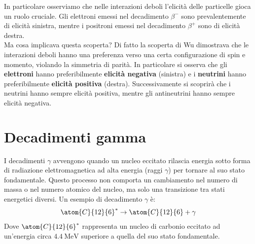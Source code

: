 
In particolare osserviamo che nelle interazioni deboli l'elicità delle particelle gioca un ruolo cruciale. Gli elettroni emessi nel decadimento $\beta^-$ sono prevalentemente di elicità sinistra, mentre i positroni emessi nel decadimento $\beta^+$ sono di elicità destra.\\
Ma cosa implicava questa scoperta? Di fatto la scoperta di Wu dimostrava che le interazioni deboli hanno una preferenza verso una certa configurazione di spin e momento, violando la simmetria di parità. In particolare si osserva che gli \textbf{elettroni} hanno preferibilmente \textbf{elicità negativa} (sinistra) e i \textbf{neutrini} hanno preferibilmente \textbf{elicità positiva} (destra). Successivamente si scoprirà che i neutrini hanno sempre elicità positiva, mentre gli antineutrini hanno sempre elicità negativa.
\section{Decadimenti gamma}
I decadimenti $\gamma$ avvengono quando un nucleo eccitato rilascia energia sotto forma di radiazione elettromagnetica ad alta energia (raggi $\gamma$) per tornare al suo stato fondamentale. Questo processo non comporta un cambiamento nel numero di massa o nel numero atomico del nucleo, ma solo una transizione tra stati energetici diversi. Un esempio di decadimento $\gamma$ è:
\begin{equation}
    \atom{C}{12}{6}^* \to \atom{C}{12}{6} + \gamma
\end{equation}
Dove $\atom{C}{12}{6}^*$ rappresenta un nucleo di carbonio eccitato ad un'energia circa $\qty{4.4}{\mega\electronvolt}$ superiore a quella del suo stato fondamentale.


